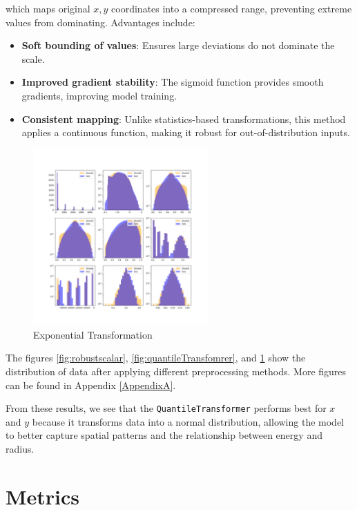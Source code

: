 \begin{itemize}
    which maps original \( x, y \) coordinates into a compressed range, preventing extreme values from dominating. Advantages include:

    \begin{itemize}
        \item \textbf{Soft bounding of values}: Ensures large deviations do not dominate the scale.
        \item \textbf{Improved gradient stability}: The sigmoid function provides smooth gradients, improving model training.
        \item \textbf{Consistent mapping}: Unlike statistics-based transformations, this method applies a continuous function, making it robust for out-of-distribution inputs.
    \end{itemize}

    \begin{figure}[h!]
        \centering
        \includegraphics[width=0.6\textwidth]{Figures/original.png}
        \caption{Exponential Transformation}\label{fig:exponential_transformation}
    \end{figure}
\end{itemize}

The figures \ref{fig:robustscalar}, \ref{fig:quantileTransfomrer}, and \ref{fig:exponential_transformation} show the distribution of data after applying different preprocessing methods. More figures can be found in Appendix \ref{AppendixA}. 

From these results, we see that the \texttt{QuantileTransformer} performs best for \( x \) and \( y \) because it transforms data into a normal distribution, allowing the model to better capture spatial patterns and the relationship between energy and radius.


\section{Metrics}
